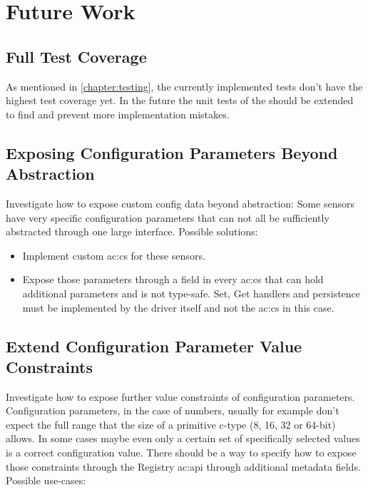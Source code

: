 \chapter{Future Work}
\label{chapter:future_work}

\section{Full Test Coverage}

As mentioned in \ref{chapter:testing}, the currently implemented tests don't have the highest test coverage yet.
In the future the unit tests of the  should be extended to find and prevent more implementation mistakes.

\section{Exposing Configuration Parameters Beyond Abstraction}

Investigate how to expose custom config data beyond abstraction:
Some sensors have very specific configuration parameters that can not all be sufficiently abstracted through one large interface.
Possible solutions:

\begin{itemize}
    \item Implement custom \gls{ac:cs} for these sensors.

    \item Expose those parameters through a field in every \gls{ac:cs} that can hold additional parameters and is not type-safe.
          Set, Get handlers and persistence must be implemented by the driver itself and not the \gls{ac:cs} in this case.
\end{itemize}

\section{Extend Configuration Parameter Value Constraints}

Investigate how to expose further value constraints of configuration parameters.
Configuration parameters, in the case of numbers, usually for example don't expect the full range that the size of a primitive c-type (8, 16, 32 or 64-bit) allows.
In some cases maybe even only a certain set of specifically selected values is a correct configuration value.
There should be a way to specify how to expose those constraints through the Registry \gls{ac:api} through additional metadata fields.
Possible use-cases:

